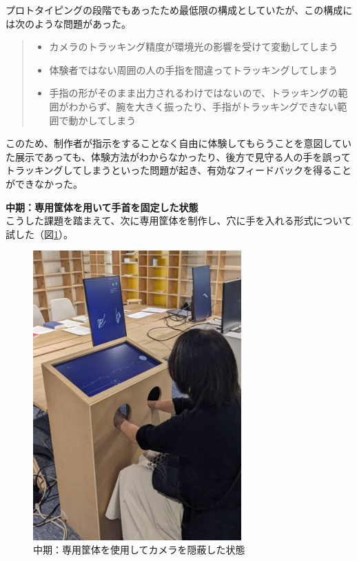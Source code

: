 プロトタイピングの段階でもあったため最低限の構成としていたが、この構成には次のような問題があった。
\begin{quote}
  \begin{itemize}
    \item カメラのトラッキング精度が環境光の影響を受けて変動してしまう
    \item 体験者ではない周囲の人の手指を間違ってトラッキングしてしまう
    \item 手指の形がそのまま出力されるわけではないので、トラッキングの範囲がわからず、腕を大きく振ったり、手指がトラッキングできない範囲で動かしてしまう
  \end{itemize}
\end{quote}

このため、制作者が指示をすることなく自由に体験してもらうことを意図していた展示であっても、体験方法がわからなかったり、後方で見守る人の手を誤ってトラッキングしてしまうといった問題が起き、有効なフィードバックを得ることができなかった。

\textbf{中期：専用筐体を用いて手首を固定した状態}\\
こうした課題を踏まえて、次に専用筐体を制作し、穴に手を入れる形式について試した（図\ref{fig:kyotai_ver1}）。

\begin{figure}[H]
  \centering
  \includegraphics[width=8cm]{img/kyotai_ver1.jpg}
  \caption{中期：専用筐体を使用してカメラを隠蔽した状態}
  \label{fig:kyotai_ver1}
\end{figure}

